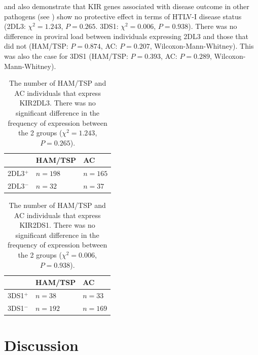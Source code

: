  and  also demonstrate that KIR genes associated with disease outcome in other pathogens (see ) show no protective effect in terms of HTLV-I disease status (2DL3: $\chi^2 = 1.243$, $P = 0.265$. 3DS1: $\chi^2 = 0.006$, $P = 0.938$). There was no difference in proviral load between individuals expressing 2DL3 and those that did not (HAM/TSP: $P = 0.874$, AC: $P = 0.207$, Wilcoxon-Mann-Whitney). This was also the case for 3DS1 (HAM/TSP: $P = 0.393$, AC: $P = 0.289$, Wilcoxon-Mann-Whitney).

\begin{table}[htp]
\begin{center}
\begin{tabular}{|l|ll|}
\hline
 & HAM/TSP & AC \bigstrut \\
\hline
2DL3$^+$ & $n = 198$ & $n = 165$ \bigstrut[t] \\
2DL3$^-$ & $n = 32$ & $n = 37$ \bigstrut[b] \\
\hline
\end{tabular}
\end{center}
\caption[Disease risk and 2DL3]{The number of HAM/TSP and AC individuals that express KIR2DL3. There was no significant difference in the frequency of expression between the 2 groups ($\chi^2 = 1.243$, $P = 0.265$).}
\label{chapter7/table2DL3}
\end{table}

\begin{table}[htp]
\begin{center}
\begin{tabular}{|l|ll|}
\hline
 & HAM/TSP & AC \bigstrut \\
\hline
3DS1$^+$ & $n = 38$ & $n = 33$ \bigstrut[t] \\
3DS1$^-$ & $n = 192$ & $n = 169$ \bigstrut[b] \\
\hline
\end{tabular}
\end{center}
\caption[Disease risk and 2DS1]{The number of HAM/TSP and AC individuals that express KIR2DS1. There was no significant difference in the frequency of expression between the 2 groups ($\chi^2 = 0.006$, $P = 0.938$).}
\label{chapter7/table3DS1}
\end{table}

\section{Discussion}\label{chapter7/discussion}

